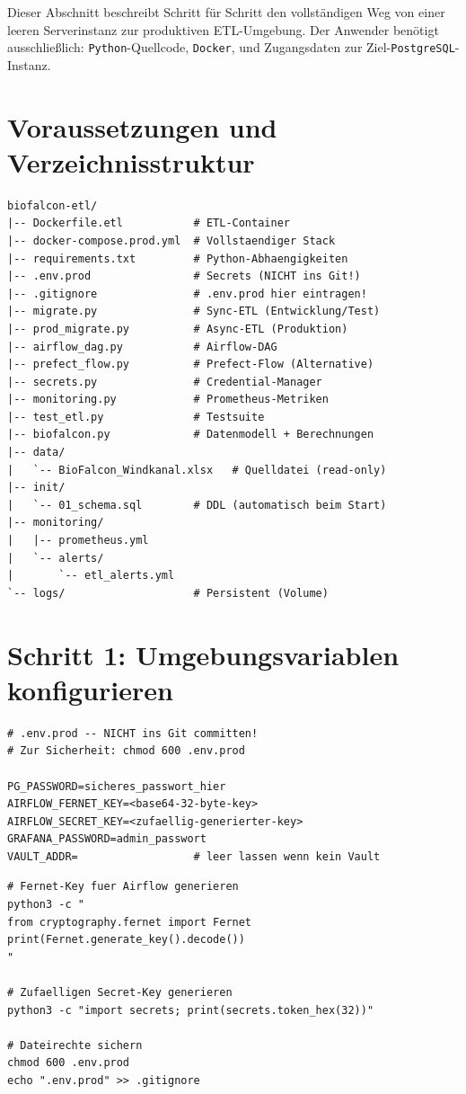﻿\documentclass[12pt,a4paper]{report}
\theoremstyle{definition}
\theoremstyle{remark}
\newcommand{\pg}{\texttt{PostgreSQL}}
\newcommand{\py}{\texttt{Python}}
\newcommand{\docker}{\texttt{Docker}}
\begin{document}
Dieser Abschnitt beschreibt Schritt für Schritt den vollständigen
Weg von einer leeren Serverinstanz zur produktiven ETL-Umgebung.
Der Anwender ben\"otigt ausschlie\ss{}lich: \py-Quellcode, \docker{},
und Zugangsdaten zur Ziel-\pg-Instanz.

\section{Voraussetzungen und Verzeichnisstruktur}

\begin{lstlisting}[style=bash, caption={Verzeichnisstruktur des Produktiv-Deployments}]
biofalcon-etl/
|-- Dockerfile.etl           # ETL-Container
|-- docker-compose.prod.yml  # Vollstaendiger Stack
|-- requirements.txt         # Python-Abhaengigkeiten
|-- .env.prod                # Secrets (NICHT ins Git!)
|-- .gitignore               # .env.prod hier eintragen!
|-- migrate.py               # Sync-ETL (Entwicklung/Test)
|-- prod_migrate.py          # Async-ETL (Produktion)
|-- airflow_dag.py           # Airflow-DAG
|-- prefect_flow.py          # Prefect-Flow (Alternative)
|-- secrets.py               # Credential-Manager
|-- monitoring.py            # Prometheus-Metriken
|-- test_etl.py              # Testsuite
|-- biofalcon.py             # Datenmodell + Berechnungen
|-- data/
|   `-- BioFalcon_Windkanal.xlsx   # Quelldatei (read-only)
|-- init/
|   `-- 01_schema.sql        # DDL (automatisch beim Start)
|-- monitoring/
|   |-- prometheus.yml
|   `-- alerts/
|       `-- etl_alerts.yml
`-- logs/                    # Persistent (Volume)
\end{lstlisting}

\section{Schritt 1: Umgebungsvariablen konfigurieren}

\begin{lstlisting}[style=bash, caption={.env.prod: Produktivkonfiguration (Beispiel)}]
# .env.prod -- NICHT ins Git committen!
# Zur Sicherheit: chmod 600 .env.prod

PG_PASSWORD=sicheres_passwort_hier
AIRFLOW_FERNET_KEY=<base64-32-byte-key>
AIRFLOW_SECRET_KEY=<zufaellig-generierter-key>
GRAFANA_PASSWORD=admin_passwort
VAULT_ADDR=                  # leer lassen wenn kein Vault
\end{lstlisting}

\begin{lstlisting}[style=bash, caption={Generierung sicherer Schlussel}]
# Fernet-Key fuer Airflow generieren
python3 -c "
from cryptography.fernet import Fernet
print(Fernet.generate_key().decode())
"

# Zufaelligen Secret-Key generieren
python3 -c "import secrets; print(secrets.token_hex(32))"

# Dateirechte sichern
chmod 600 .env.prod
echo ".env.prod" >> .gitignore
\end{lstlisting}
\end{document}
